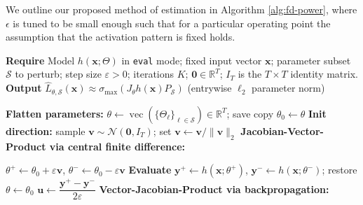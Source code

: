 \documentclass{article}
\theoremstyle{plain}
\theoremstyle{definition}
\theoremstyle{remark}
\begin{document}
We outline our proposed method of estimation in Algorithm \ref{alg:fd-power}, where $\epsilon$ is tuned to be small enough such that for a particular operating point the assumption that the activation pattern is fixed holds. 

\begin{algorithm}[H]
\caption{Finite-Difference Power Iteration for $\sigma_{\max}(J_{\theta}h(\textbf{x})P_{\mathcal S})$}
\label{alg:fd-power}
\hspace*{\algorithmicindent} \textbf{Require} Model $h(\textbf{x};\Theta)$ in \texttt{eval} mode; fixed input vector $\textbf{x}$; parameter subset $\mathcal{S}$ to perturb; step size $\varepsilon>0$; iterations $K$; $\textbf{0} \in \mathbb{R}^T$;  $I_T$ is the $T \times T$ identity matrix.\\
\hspace*{\algorithmicindent} \textbf{Output}  $\widehat{L}_{\theta,\mathcal S}(\textbf{x})\approx \sigma_{\max}(J_{\theta}h(\textbf{x})P_{\mathcal S})$ (entrywise $\ell_2$ parameter norm)
\begin{algorithmic}[1]
\State \textbf{Flatten parameters:} $\theta \gets \operatorname{vec}(\{\Theta_\ell\}_{\ell\in\mathcal{S}})\in\mathbb{R}^{T}$; save copy $\theta_0 \gets \theta$
\State \textbf{Init direction:} sample $\textbf{v} \sim \mathcal{N}(\textbf{0},I_T)$; set $\textbf{v} \gets \textbf{v}/\|\textbf{v}\|_2$
    \State \textbf{Jacobian-Vector-Product via central finite difference:}
     
    $\theta^{+}\!\gets\!\theta_0+\varepsilon \mathbf{v}$, \quad $\theta^{-}\!\gets\!\theta_0-\varepsilon \mathbf{v}$ 
    \State \textbf{Evaluate} $\mathbf{y}^{+}\!\gets\!h(\mathbf{x};\theta^{+})$, $\mathbf{y}^{-}\!\gets\!h(\mathbf{x};\theta^{-})$; restore $\theta\!\gets\!\theta_0$
    \State $\mathbf{u} \gets \dfrac{\mathbf{y}^{+}-\mathbf{y}^{-}}{2\varepsilon}$ 
    \vspace{0.8ex}
    \State \textbf{Vector-Jacobian-Product via backpropagation:} 
    

\end{algorithmic}
\end{algorithm}
\end{document}
